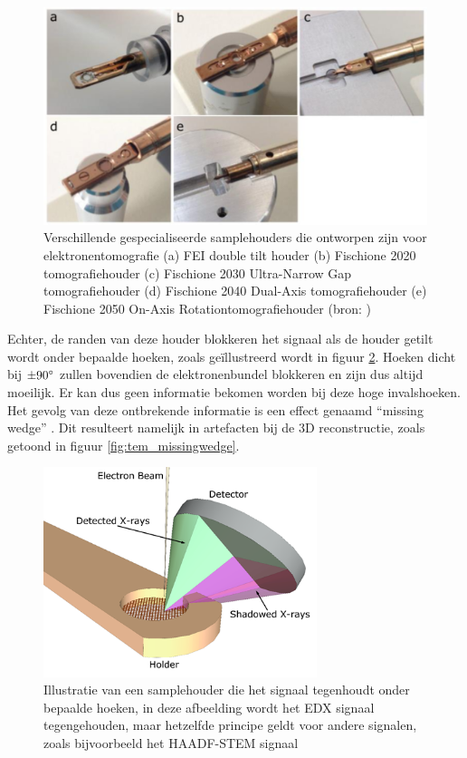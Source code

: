 \documentclass{report}
\begin{document}
\begin{figure}[h!]
	\centering
	\includegraphics[width=15cm]{images/tem/tomoholders.png}
	\caption{Verschillende gespecialiseerde samplehouders die ontworpen zijn voor elektronentomografie (a) FEI double tilt houder (b) Fischione 2020 tomografiehouder (c) Fischione 2030 Ultra-Narrow Gap tomografiehouder (d) Fischione 2040 Dual-Axis tomografiehouder (e) Fischione 2050 On-Axis Rotationtomografiehouder (bron: \cite{thesis:zanaga})}
	\label{fig:tem_tomoholders}
\end{figure}
Echter, de randen van deze houder blokkeren het signaal als de houder getilt wordt onder bepaalde hoeken, zoals geïllustreerd wordt in figuur \ref{fig:tem_tomoholder}. Hoeken dicht bij $\pm 90\degree$ zullen bovendien de elektronenbundel blokkeren en zijn dus altijd moeilijk. Er kan dus geen informatie bekomen worden bij deze hoge invalshoeken. Het gevolg van deze ontbrekende informatie is een effect genaamd ``missing wedge'' \cite{paper:missingwedge}. Dit resulteert namelijk in artefacten bij de 3D reconstructie, zoals getoond in figuur \ref{fig:tem_missingwedge}.
\begin{figure}[h!]
	\centering
	\includegraphics[width=8cm]{images/tem/tomoholder.png}
	\caption{Illustratie van een samplehouder die het signaal tegenhoudt onder bepaalde hoeken, in deze afbeelding wordt het EDX signaal tegengehouden, maar hetzelfde principe geldt voor andere signalen, zoals bijvoorbeeld het HAADF-STEM signaal}
	\label{fig:tem_tomoholder}
\end{figure}
\end{document}
